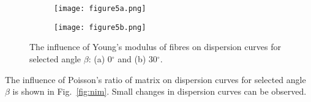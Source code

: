 \documentclass[preprint,12pt]{elsarticle}
\providecommand{\DIFaddbeginFL}{} %
\providecommand{\DIFaddendFL}{} %
\providecommand{\DIFdelbeginFL}{} %
\providecommand{\DIFdelendFL}{} %
\begin{document}
\begin{figure} [h!]
	\centering
	\DIFdelbeginFL %
\DIFdelendFL \begin{subfigure}[b]{0.49\textwidth}
		\centering
		\DIFdelbeginFL %
\DIFdelendFL \DIFaddbeginFL \texttt{[image: figure5a.png]}
		\DIFaddendFL \caption{}
		\label{fig:ef0}
	\end{subfigure}
	\hfill
	\begin{subfigure}[b]{0.49\textwidth}
		\centering
		\DIFdelbeginFL %
\DIFdelendFL \DIFaddbeginFL \texttt{[image: figure5b.png]}
		\DIFaddendFL \caption{}
		\label{fig:ef30}
	\end{subfigure}
		\caption{The influence of Young's modulus of fibres on dispersion curves for selected angle $\beta$: (a) 0$^{\circ}$ and (b) 30$^{\circ}$.} 
	\label{fig:ef}
\end{figure}

The influence of  Poisson's ratio of matrix on dispersion curves for selected angle $\beta$ is shown in Fig.~\ref{fig:nim}. Small changes in dispersion curves can be observed.
\end{document}
